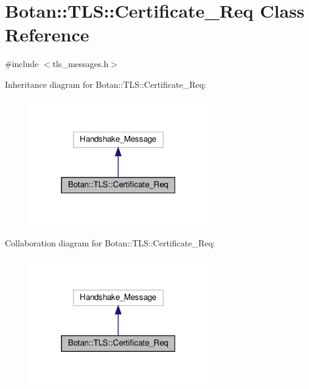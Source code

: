 \hypertarget{class_botan_1_1_t_l_s_1_1_certificate___req}{}\section{Botan\+:\+:T\+LS\+:\+:Certificate\+\_\+\+Req Class Reference}
\label{class_botan_1_1_t_l_s_1_1_certificate___req}


{\ttfamily \#include $<$tls\+\_\+messages.\+h$>$}



Inheritance diagram for Botan\+:\+:T\+LS\+:\+:Certificate\+\_\+\+Req\+:
\nopagebreak
\begin{figure}[H]
\begin{center}
\leavevmode
\includegraphics[width=220pt]{class_botan_1_1_t_l_s_1_1_certificate___req__inherit__graph}
\end{center}
\end{figure}


Collaboration diagram for Botan\+:\+:T\+LS\+:\+:Certificate\+\_\+\+Req\+:
\nopagebreak
\begin{figure}[H]
\begin{center}
\leavevmode
\includegraphics[width=220pt]{class_botan_1_1_t_l_s_1_1_certificate___req__coll__graph}
\end{center}
\end{figure}
